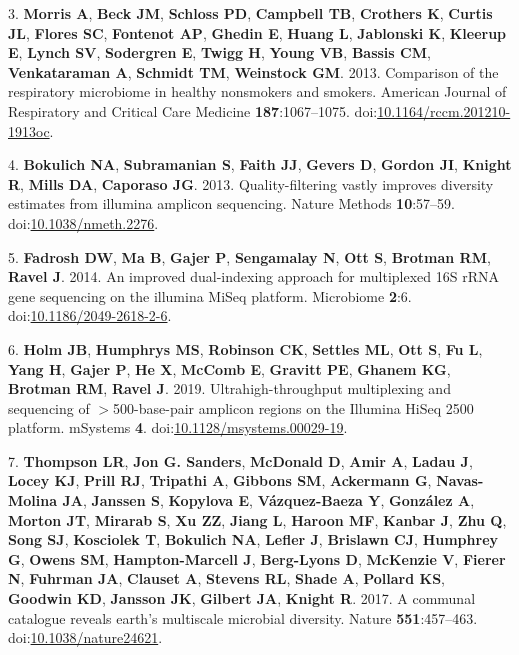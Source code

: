 \documentclass[]{article}
\begin{document}
3. \textbf{Morris A}, \textbf{Beck JM}, \textbf{Schloss PD},
\textbf{Campbell TB}, \textbf{Crothers K}, \textbf{Curtis JL},
\textbf{Flores SC}, \textbf{Fontenot AP}, \textbf{Ghedin E},
\textbf{Huang L}, \textbf{Jablonski K}, \textbf{Kleerup E},
\textbf{Lynch SV}, \textbf{Sodergren E}, \textbf{Twigg H}, \textbf{Young
VB}, \textbf{Bassis CM}, \textbf{Venkataraman A}, \textbf{Schmidt TM},
\textbf{Weinstock GM}. 2013. Comparison of the respiratory microbiome in
healthy nonsmokers and smokers. American Journal of Respiratory and
Critical Care Medicine \textbf{187}:1067--1075.
doi:\href{http://dx.doi.org/10.1164/rccm.201210-1913oc}{10.1164/rccm.201210-1913oc}.

4. \textbf{Bokulich NA}, \textbf{Subramanian S}, \textbf{Faith JJ},
\textbf{Gevers D}, \textbf{Gordon JI}, \textbf{Knight R}, \textbf{Mills
DA}, \textbf{Caporaso JG}. 2013. Quality-filtering vastly improves
diversity estimates from illumina amplicon sequencing. Nature Methods
\textbf{10}:57--59.
doi:\href{http://dx.doi.org/10.1038/nmeth.2276}{10.1038/nmeth.2276}.

5. \textbf{Fadrosh DW}, \textbf{Ma B}, \textbf{Gajer P},
\textbf{Sengamalay N}, \textbf{Ott S}, \textbf{Brotman RM},
\textbf{Ravel J}. 2014. An improved dual-indexing approach for
multiplexed 16S rRNA gene sequencing on the illumina MiSeq platform.
Microbiome \textbf{2}:6.
doi:\href{http://dx.doi.org/10.1186/2049-2618-2-6}{10.1186/2049-2618-2-6}.

6. \textbf{Holm JB}, \textbf{Humphrys MS}, \textbf{Robinson CK},
\textbf{Settles ML}, \textbf{Ott S}, \textbf{Fu L}, \textbf{Yang H},
\textbf{Gajer P}, \textbf{He X}, \textbf{McComb E}, \textbf{Gravitt PE},
\textbf{Ghanem KG}, \textbf{Brotman RM}, \textbf{Ravel J}. 2019.
Ultrahigh-throughput multiplexing and sequencing of $>$500-base-pair
amplicon regions on the Illumina HiSeq 2500 platform. mSystems
\textbf{4}.
doi:\href{http://dx.doi.org/10.1128/msystems.00029-19}{10.1128/msystems.00029-19}.

7. \textbf{Thompson LR}, \textbf{Jon G. Sanders}, \textbf{McDonald D},
\textbf{Amir A}, \textbf{Ladau J}, \textbf{Locey KJ}, \textbf{Prill RJ},
\textbf{Tripathi A}, \textbf{Gibbons SM}, \textbf{Ackermann G},
\textbf{Navas-Molina JA}, \textbf{Janssen S}, \textbf{Kopylova E},
\textbf{V{á}zquez-Baeza Y}, \textbf{Gonz{á}lez A}, \textbf{Morton JT},
\textbf{Mirarab S}, \textbf{Xu ZZ}, \textbf{Jiang L}, \textbf{Haroon
MF}, \textbf{Kanbar J}, \textbf{Zhu Q}, \textbf{Song SJ},
\textbf{Kosciolek T}, \textbf{Bokulich NA}, \textbf{Lefler J},
\textbf{Brislawn CJ}, \textbf{Humphrey G}, \textbf{Owens SM},
\textbf{Hampton-Marcell J}, \textbf{Berg-Lyons D}, \textbf{McKenzie V},
\textbf{Fierer N}, \textbf{Fuhrman JA}, \textbf{Clauset A},
\textbf{Stevens RL}, \textbf{Shade A}, \textbf{Pollard KS},
\textbf{Goodwin KD}, \textbf{Jansson JK}, \textbf{Gilbert JA},
\textbf{Knight R}. 2017. A communal catalogue reveals earth's multiscale
microbial diversity. Nature \textbf{551}:457--463.
doi:\href{http://dx.doi.org/10.1038/nature24621}{10.1038/nature24621}.
\end{document}
